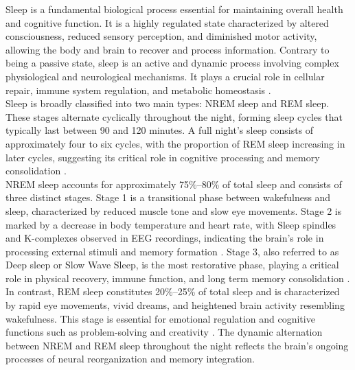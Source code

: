 Sleep is a fundamental biological process essential for maintaining overall health and cognitive function. It is a highly regulated state characterized by altered consciousness, reduced sensory perception, and diminished motor activity, allowing the body and brain to recover and process information. Contrary to being a passive state, sleep is an active and dynamic process involving complex physiological and neurological mechanisms. It plays a crucial role in cellular repair, immune system regulation, and metabolic homeostasis \parencite{walker2017we}.\\

Sleep is broadly classified into two main types: \ac{NREM} sleep and \ac{REM} sleep. These stages alternate cyclically throughout the night, forming sleep cycles that typically last between 90 and 120 minutes. A full night’s sleep consists of approximately four to six cycles, with the proportion of REM sleep increasing in later cycles, suggesting its critical role in cognitive processing and memory consolidation \parencite{carskadon2005normal}.\\

\ac{NREM} sleep accounts for approximately 75\%–80\% of total sleep and consists of three distinct stages. Stage 1 is a transitional phase between wakefulness and sleep, characterized by reduced muscle tone and slow eye movements. Stage 2 is marked by a decrease in body temperature and heart rate, with Sleep spindles and K-complexes observed in \ac{EEG} recordings, indicating the brain’s role in processing external stimuli and memory formation \parencite{de2003sleep}. Stage 3, also referred to as Deep sleep or Slow Wave Sleep, is the most restorative phase, playing a critical role in physical recovery, immune function, and long term memory consolidation \parencite{diekelmann2010memory}.\\

In contrast, REM sleep constitutes 20\%–25\% of total sleep and is characterized by rapid eye movements, vivid dreams, and heightened brain activity resembling wakefulness. This stage is essential for emotional regulation and cognitive functions such as problem-solving and creativity \parencite{bjorn2013sleep}. The dynamic alternation between NREM and REM sleep throughout the night reflects the brain's ongoing processes of neural reorganization and memory integration.\\

